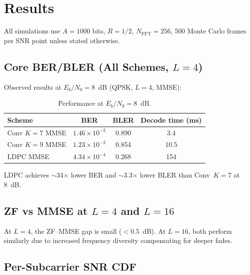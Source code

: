 \documentclass[12pt, a4paper]{article}
\begin{document}
\section{Results}
All simulations use $A\!=\!1000$ bits, $R\!=\!1/2$, $N_{\text{FFT}}\!=\!256$, 500 Monte Carlo frames per SNR point unless stated otherwise.

\subsection{Core BER/BLER (All Schemes, $L=4$)}

Observed results at $E_b/N_0=8$~dB (QPSK, $L=4$, MMSE):
\begin{table}[H]\centering
\caption{Performance at $E_b/N_0=8$~dB.}
\begin{tabular}{lccc}
\toprule
Scheme & BER & BLER & Decode time (ms) \\
\midrule
Conv $K\!=\!7$ MMSE & $1.46\times10^{-2}$ & 0.890 & 3.4 \\
Conv $K\!=\!9$ MMSE & $1.23\times10^{-2}$ & 0.854 & 10.5 \\
LDPC MMSE & $4.34\times10^{-4}$ & 0.268 & 154 \\
\bottomrule
\end{tabular}
\end{table}

LDPC achieves $\sim$34$\times$ lower BER and $\sim$3.3$\times$ lower BLER than Conv~$K\!=\!7$ at 8~dB.

\subsection{ZF vs MMSE at $L=4$ and $L=16$}

At $L=4$, the ZF--MMSE gap is small ($<0.5$~dB). At $L=16$, both perform similarly due to increased frequency diversity compensating for deeper fades.

\subsection{Per-Subcarrier SNR CDF}
\end{document}

